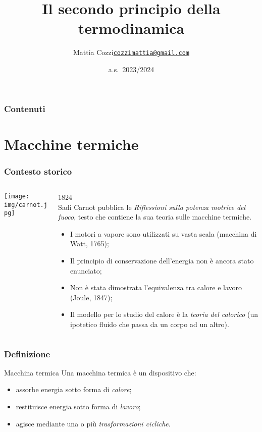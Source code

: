 \documentclass[]{beamer}
\title{Il secondo principio della termodinamica}
\author{\texorpdfstring{Mattia Cozzi\newline\href{mailto:cozzimattia@gmail.com}{\texttt{cozzimattia@gmail.com}}}{Mattia Cozzi}}
\date{a.s.~2023/2024}
\theoremstyle{plain}
\begin{document}
\begin{frame}
  \titlepage
\end{frame}





\begin{frame}
\frametitle{Contenuti}
\tableofcontents
\end{frame}



\section{Macchine termiche}

\begin{frame}
\frametitle{Contesto storico}
\begin{columns}
\begin{column}{0.2\textwidth}
\texttt{[image: img/carnot.jpg]}
\end{column}
\begin{column}{0.7\textwidth}
1824\\Sadi Carnot pubblica le \emph{Riflessioni sulla potenza motrice del fuoco}, testo che contiene la sua teoria sulle macchine termiche.\pause

\begin{itemize}
\item<2-> I motori a vapore sono utilizzati su vasta scala (macchina di Watt, 1765);
\item<3-> Il principio di conservazione dell'energia non è ancora stato enunciato;
\item<4-> Non è stata dimostrata l'equivalenza tra calore e lavoro (Joule, 1847);
\item<5-> Il modello per lo studio del calore è la \emph{teoria del calorico} (un ipotetico fluido che passa da un corpo ad un altro).
\end{itemize}
\end{column}
\end{columns}
\end{frame}

\begin{frame}
\frametitle{Definizione}
\begin{block}{Macchina termica}
Una macchina termica è un dispositivo che:\pause
\begin{itemize}
  \item assorbe energia sotto forma di \emph{calore};\pause
  \item restituisce energia sotto forma di \emph{lavoro};\pause
  \item agisce mediante una o più \emph{trasformazioni cicliche}.
\end{itemize}
\end{block}
\end{frame}
\end{document}
